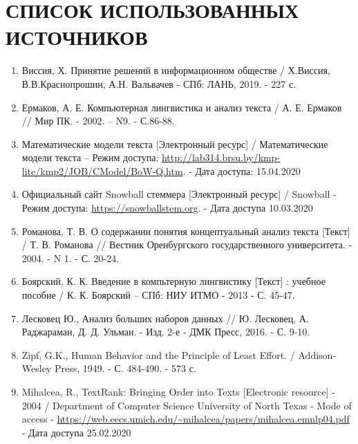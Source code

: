 \chapter*{СПИСОК ИСПОЛЬЗОВАННЫХ ИСТОЧНИКОВ}

\begin{enumerate}
    \item \label{itm:vissia} Виссия, Х. Принятие решений в информационном обществе  / Х.Виссия, В.В.Краснопрошин, А.Н. Вальвачев - СПб: ЛАНЬ, 2019. - 227 с. 

    \item \label{itm:ermakov} Ермаков, А. Е. Компьютерная лингвистика и анализ текста / А. Е. Ермаков // Мир ПК. - 2002. – N9. - С.86-88.

    \item \label{itm:mathmodel} Математические модели текста [Электронный ресурс] / Математические модели текста – Режим доступа: \url{http://lab314.brsu.by/kmp-lite/kmp2/JOB/CModel/BoW-Q.htm}. - Дата доступа: 15.04.2020

    \item \label{itm:snowball} Официальный сайт Snowball стеммера [Электронный ресурс] / Snowball - Режим доступа: \url{https://snowballstem.org}. - Дата доступа 10.03.2020

    \item \label{itm:romanova} Романова, Т. В. О содержании понятия концептуальный анализ текста [Текст] / Т. В. Романова // Вестник Оренбургского государственного университета. - 2004. - N 1. - С. 20-24.

    \item \label{itm:boyarsky} Боярский, К. К. Введение в компьтерную лингвистику [Текст] : учебное пособие / К. К. Боярский – СПб: НИУ ИТМО - 2013 - С. 45-47.

    \item \label{itm:datamining} Лесковец Ю., Анализ больших наборов данных // Ю. Лесковец, А. Раджараман, Д. Д. Ульман. - Изд. 2-е - ДМК Пресс, 2016. - С. 9-10.

    \item \label{itm:zipf} Zipf, G.K., Human Behavior and the Principle of Least Effort. / Addison-Wesley Press, 1949. - С. 484-490. - 573 с.

    \item \label{itm:textrank} Mihalcea, R., TextRank: Bringing Order into Texts [Electronic resource] - 2004 / Department of Computer Science University of North Texas - Mode of access - \url{https://web.eecs.umich.edu/~mihalcea/papers/mihalcea.emnlp04.pdf} - Дата доступа 25.02.2020


\end{enumerate}
